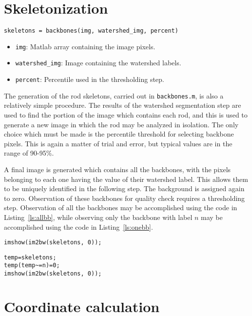 \section{Skeletonization}

\texttt{skeletons = backbones(img, watershed\_img, percent)}

\begin{itemize}
\item \texttt{img}: Matlab array containing the image pixels.
\item \texttt{watershed\_img}: Image containing the watershed labels.
\item \texttt{percent}: Percentile used in the thresholding step.
\end{itemize}

The generation of the rod skeletons, carried out in \texttt{backbones.m}, is also a relatively simple
procedure.  The results of the watershed segmentation step are used to find the portion of the 
image which contains each rod, and this is used to generate a new image in which the rod may
be analyzed in isolation. The only choice which must be made is the percentile threshold for selecting 
backbone pixels. This is again a matter of trial and error, but typical values are in the range of 90-95\%.

A final image is generated which contains all the backbones, with the pixels belonging to each one having
the value of their watershed label. This allows them to be uniquely identified in the following step. The background is 
assigned again to zero.  Observation of these backbones for quality check requires a thresholding step. Observation
of all the backbones may be accomplished using the code in Listing~\ref{ls:allbb}, while observing only the backbone 
with label $n$ may be accomplished using the code in Listing~\ref{ls:onebb}.

\begin{lstlisting}[label=ls:allbb,caption=Show all backbones as an image]
imshow(im2bw(skeletons, 0));
\end{lstlisting}

\begin{lstlisting}[label=ls:onebb,caption=Show only backbone with label $n$]
temp=skeletons;
temp(temp~=n)=0;
imshow(im2bw(skeletons, 0));
\end{lstlisting}

\section{Coordinate calculation}

